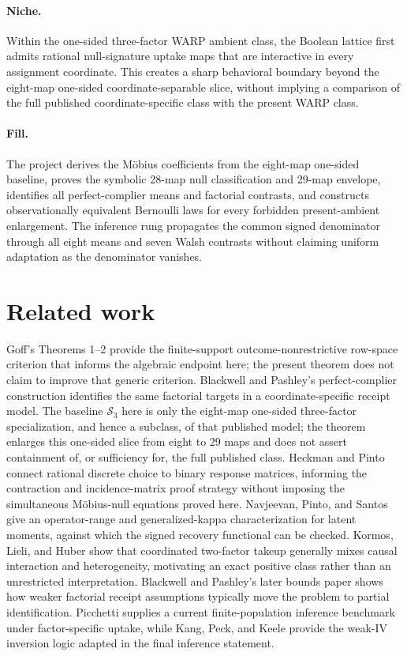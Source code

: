 \documentclass{article}
\begin{document}
\paragraph{Niche.} Within the one-sided three-factor WARP ambient class, the Boolean lattice first admits rational null-signature uptake maps that are interactive in every assignment coordinate. This creates a sharp behavioral boundary beyond the eight-map one-sided coordinate-separable slice, without implying a comparison of the full published coordinate-specific class with the present WARP class.

\paragraph{Fill.} The project derives the Möbius coefficients from the eight-map one-sided baseline, proves the symbolic 28-map null classification and 29-map envelope, identifies all perfect-complier means and factorial contrasts, and constructs observationally equivalent Bernoulli laws for every forbidden present-ambient enlargement. The inference rung propagates the common signed denominator through all eight means and seven Walsh contrasts without claiming uniform adaptation as the denominator vanishes.

\section{Related work}

Goff's Theorems 1--2 provide the finite-support outcome-nonrestrictive row-space criterion that informs the algebraic endpoint here; the present theorem does not claim to improve that generic criterion. Blackwell and Pashley's perfect-complier construction identifies the same factorial targets in a coordinate-specific receipt model. The baseline \(\mathcal S_3\) here is only the eight-map one-sided three-factor specialization, and hence a subclass, of that published model; the theorem enlarges this one-sided slice from eight to 29 maps and does not assert containment of, or sufficiency for, the full published class. Heckman and Pinto connect rational discrete choice to binary response matrices, informing the contraction and incidence-matrix proof strategy without imposing the simultaneous Möbius-null equations proved here. Navjeevan, Pinto, and Santos give an operator-range and generalized-kappa characterization for latent moments, against which the signed recovery functional can be checked. Kormos, Lieli, and Huber show that coordinated two-factor takeup generally mixes causal interaction and heterogeneity, motivating an exact positive class rather than an unrestricted interpretation. Blackwell and Pashley's later bounds paper shows how weaker factorial receipt assumptions typically move the problem to partial identification. Picchetti supplies a current finite-population inference benchmark under factor-specific uptake, while Kang, Peck, and Keele provide the weak-IV inversion logic adapted in the final inference statement.
\end{document}
